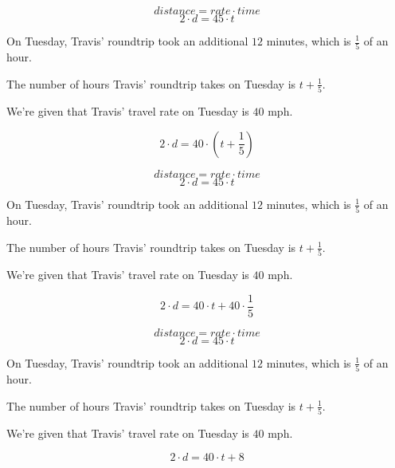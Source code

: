 \documentclass{beamer} %
\begin{document}
\begin{frame}
  \[distance = rate \cdot time\]
  \begin{equation}
    2\cdot d = 45\cdot t
  \end{equation}

  \pause On Tuesday, Travis' roundtrip took an additional $12$ minutes, which is $\frac{1}{5}$ of an hour. \pause

  The number of hours Travis' roundtrip takes on Tuesday is $t + \frac{1}{5}$. \pause

  We're given that Travis' travel rate on Tuesday is $40$ mph.\pause

  \begin{equation}
    2\cdot d = 40\cdot \left( t + \frac{1}{5} \right)
  \end{equation}
\end{frame}

\setcounter{equation}{0}

\begin{frame}
  \[distance = rate \cdot time\]
  \begin{equation}
    2\cdot d = 45\cdot t
  \end{equation}

  On Tuesday, Travis' roundtrip took an additional $12$ minutes, which is $\frac{1}{5}$ of an hour.

  The number of hours Travis' roundtrip takes on Tuesday is $t + \frac{1}{5}$.

  We're given that Travis' travel rate on Tuesday is $40$ mph.

  \begin{equation}
    2\cdot d = 40\cdot t + 40\cdot \frac{1}{5}
  \end{equation}
\end{frame}

\setcounter{equation}{0}

\begin{frame}
  \[distance = rate \cdot time\]
  \begin{equation}
    2\cdot d = 45\cdot t
  \end{equation}

  On Tuesday, Travis' roundtrip took an additional $12$ minutes, which is $\frac{1}{5}$ of an hour.

  The number of hours Travis' roundtrip takes on Tuesday is $t + \frac{1}{5}$.

  We're given that Travis' travel rate on Tuesday is $40$ mph.

  \begin{equation}
    2\cdot d = 40\cdot t + 8
  \end{equation}
\end{frame}
\end{document}

